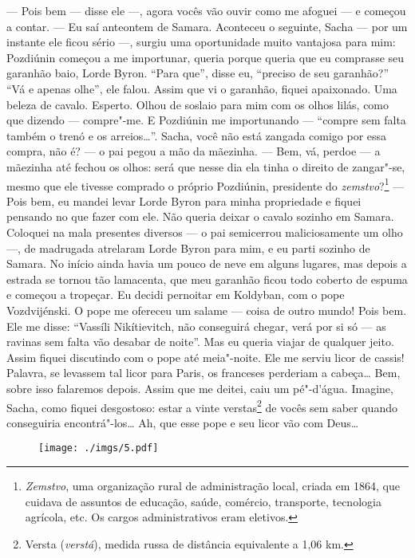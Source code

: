 --- Pois bem --- disse ele ---, agora vocês vão ouvir como me afoguei
--- e começou a contar. --- Eu saí anteontem de Samara. Aconteceu o
seguinte, Sacha --- por um instante ele ficou sério ---, surgiu uma
oportunidade muito vantajosa para mim: Pozdiúnin começou a me
importunar, queria porque queria que eu comprasse seu garanhão baio,
Lorde Byron. ``Para que'', disse eu, ``preciso de seu garanhão?'' ``Vá e
apenas olhe'', ele falou. Assim que vi o garanhão, fiquei apaixonado.
Uma beleza de cavalo. Esperto. Olhou de soslaio para mim com os olhos
lilás, como que dizendo --- compre"-me. E Pozdiúnin me importunando ---
``compre sem falta também o trenó e os arreios\ldots{}''. Sacha, você não
está zangada comigo por essa compra, não é? --- o pai pegou a mão da
mãezinha. --- Bem, vá, perdoe --- a mãezinha até fechou os olhos: será
que nesse dia ela tinha o direito de zangar"-se, mesmo que ele tivesse
comprado o próprio Pozdiúnin, presidente do \emph{zemstvo}?\footnote{\emph{Zemstvo},
  uma organização rural de administração local, criada em 1864, que
  cuidava de assuntos de educação, saúde, comércio, transporte,
  tecnologia agrícola, etc. Os cargos administrativos eram eletivos.}
--- Pois bem, eu mandei levar Lorde Byron para minha propriedade e
fiquei pensando no que fazer com ele. Não queria deixar o cavalo sozinho
em Samara. Coloquei na mala presentes diversos --- o pai semicerrou
maliciosamente um olho ---, de madrugada atrelaram Lorde Byron para mim,
e eu parti sozinho de Samara. No início ainda havia um pouco de neve em
alguns lugares, mas depois a estrada se tornou tão lamacenta, que meu
garanhão ficou todo coberto de espuma e começou a tropeçar. Eu decidi
pernoitar em Koldyban, com o pope Vozdvijénski. O pope me ofereceu um
salame --- coisa de outro mundo! Pois bem. Ele me disse: ``Vassíli
Nikítievitch, não conseguirá chegar, verá por si só --- as ravinas sem
falta vão desabar de noite''. Mas eu queria viajar de qualquer jeito.
Assim fiquei discutindo com o pope até meia"-noite. Ele me serviu licor
de cassis! Palavra, se levassem tal licor para Paris, os franceses
perderiam a cabeça\ldots{} Bem, sobre isso falaremos depois. Assim que me
deitei, caiu um pé"-d'água. Imagine, Sacha, como fiquei desgostoso: estar
a vinte verstas\footnote{Versta (\emph{verstá}), medida russa de
  distância equivalente a 1,06 km.} de vocês sem saber quando
conseguiria encontrá"-los\ldots{} Ah, que esse pope e seu licor vão com
Deus\ldots{}

\begin{figure}
\vspace*{-2.1cm}
\hspace*{-2.5cm}\texttt{[image: ./imgs/5.pdf]}
\end{figure}

